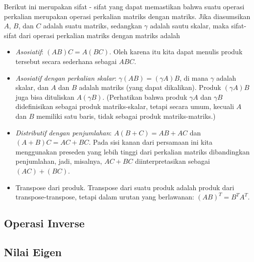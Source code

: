 Berikut ini merupakan sifat - sifat yang dapat memastikan bahwa suatu operasi
perkalian merupakan operasi perkalian matriks dengan matriks. Jika diasumsikan $A$,
$B$, dan $C$ adalah suatu matriks, sedangkan $\gamma$ adalah sautu skalar, maka sifat-sifat
dari operasi perkalian matriks dengan matriks adalah
\begin{itemize}
  \item \emph{Asosiatif}: $(AB)C = A(BC)$. Oleh karena itu kita dapat menulis
    produk tersebut secara sederhana sebagai $ABC$.

  \item \emph{Asosiatif dengan perkalian skalar}: $\gamma(AB) = (\gamma A)B$, di
    mana $\gamma$ adalah skalar, dan $A$ dan $B$ adalah matriks (yang dapat
    dikalikan). Produk $(\gamma A)B$ juga bisa dituliskan $A(\gamma B)$. (Perhatikan
    bahwa produk $\gamma A$ dan $\gamma B$ didefinisikan sebagai produk matriks-skalar,
    tetapi secara umum, kecuali $A$ dan $B$ memiliki satu baris, tidak sebagai produk
    matriks-matriks.)

  \item \emph{Distributif dengan penjumlahan}: $A(B + C) = AB + AC$ dan $(A + B)C
    = AC + BC$. Pada sisi kanan dari persamaan ini kita menggunakan preseden
    yang lebih tinggi dari perkalian matriks dibandingkan penjumlahan, jadi,
    misalnya, $AC + BC$ diinterpretasikan sebagai $(AC) + (BC)$.

  \item Transpose dari produk. Transpose dari suatu produk adalah produk dari
    transpose-transpose, tetapi dalam urutan yang berlawanan:
    $(AB)^{T}= B^{T}A^{T}$.
\end{itemize}

\subsection{Operasi Inverse}

\subsection{Nilai Eigen}



